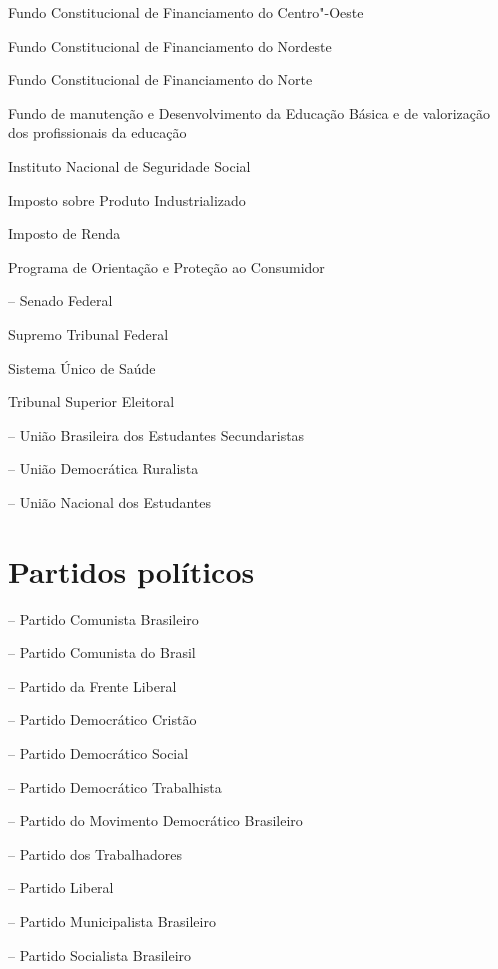  Fundo Constitucional de Financiamento do Centro"-Oeste

 Fundo Constitucional de Financiamento do Nordeste

 Fundo Constitucional de Financiamento do Norte

 Fundo de manutenção e Desenvolvimento da Educação
Básica e de valorização dos profissionais da educação

 Instituto Nacional de Seguridade Social

 Imposto sobre Produto Industrializado

 Imposto de Renda

 Programa de Orientação e Proteção ao Consumidor

 -- Senado Federal

 Supremo Tribunal Federal

 Sistema Único de Saúde

 Tribunal Superior Eleitoral

 -- União Brasileira dos Estudantes Secundaristas

 -- União Democrática Ruralista

 -- União Nacional dos Estudantes

\section{Partidos políticos}

 -- Partido Comunista Brasileiro

 -- Partido Comunista do Brasil

 -- Partido da Frente Liberal

 -- Partido Democrático Cristão

 -- Partido Democrático Social

 -- Partido Democrático Trabalhista

 -- Partido do Movimento Democrático Brasileiro

 -- Partido dos Trabalhadores

 -- Partido Liberal

 -- Partido Municipalista Brasileiro

 -- Partido Socialista Brasileiro

